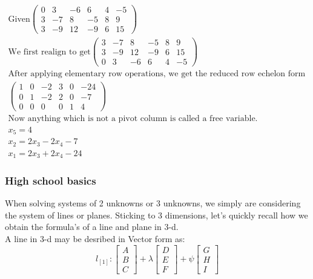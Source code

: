\documentclass{article}
\begin{document}
\begin{tcolorbox}
    \begin{align*}
     \text{Given} \left(\begin{matrix}0&3&-6&6&4&-5\\3&-7&8&-5&8&9\\3&-9&12&-9&6&15\end{matrix}\right)\\
     \text{We first realign to get} \left(\begin{matrix}3&-7&8&-5&8&9\\3&-9&12&-9&6&15\\0&3&-6&6&4&-5\end{matrix}\right) \\
     \text{After applying elementary row operations, we get the reduced row echelon form of}\\
     \left(\begin{matrix}1&0&-2&3&0&-24\\0&1&-2&2&0&-7\\0&0&0&0&1&4\end{matrix}\right)\\ 
     \text{Now anything which is not a pivot column is called a free variable.}\\
     x_{5} = 4\\
     x_{2} = 2x_{3} - 2x_{4} - 7\\
     x_{1} = 2x_{3} + 2x_{4} - 24
     \end{align*}
\end{tcolorbox}

\subsubsection{High school basics}

When solving systems of 2 unknowns or 3 unknowns, we simply are considering the system of lines or planes. Sticking to 3 dimensions, let's quickly recall how we obtain the formula's of a line and plane in 3-d. 
\\
A line in 3-d may be desribed in Vector form as:
\begin{equation*}
    l_[1] : \begin{bmatrix}
        A\\
        B\\
        C
    \end{bmatrix}
    + 
    \lambda\begin{bmatrix}
        D\\
        E\\
        F
    \end{bmatrix}
    +
    \psi\begin{bmatrix}
        G\\
        H\\
        I
    \end{bmatrix}
\end{equation*}
\end{document}
